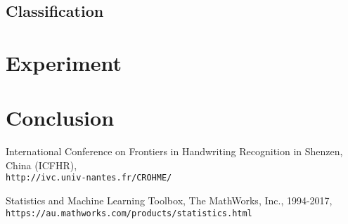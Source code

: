 \documentclass[twocolumn]{article}%
\begin{document}
	\subsection{Classification}
	
	
	\section{Experiment}
		
	
	\section{Conclusion}
	
	\begin{thebibliography}{9}
		International Conference on Frontiers in Handwriting Recognition in Shenzen, China (ICFHR),
		\\\texttt{http://ivc.univ-nantes.fr/CROHME/}
		
		Statistics and Machine Learning Toolbox, The MathWorks, Inc., 1994-2017,
		\\\texttt{https://au.mathworks.com/products/statistics.html}
		
		
	\end{thebibliography}
\end{document}
